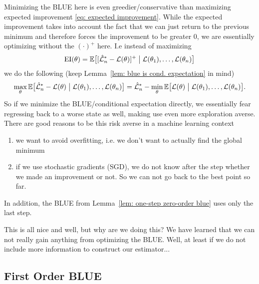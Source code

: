 Minimizing the BLUE here is even greedier/conservative than maximizing
expected improvement \eqref{eq: expected improvement}. While the expected
improvement takes into account the fact that we can just return to the previous
minimum and therefore forces the improvement to be greater \(0\), we are
essentially optimizing without the \((\cdot)^+\) here. I.e instead of
maximizing
\begin{equation*}
	\operatorname{EI}(\theta) = \mathbb{E}\big[
			[\hat{\mathcal{L}}_n^*- \mathcal{L}(\theta)]^+
			\bigm|
			\mathcal{L}(\theta_1),\dots, \mathcal{L}(\theta_n)
		\big]
\end{equation*}
we do the following (keep Lemma~\ref{lem: blue is cond. expectation} in mind)
\begin{equation*}
	\max_{\theta} \mathbb{E}\big[
		\hat{\mathcal{L}}_n^*- \mathcal{L}(\theta)
		\bigm|
		\mathcal{L}(\theta_1),\dots, \mathcal{L}(\theta_n)
	\big]
	= \hat{\mathcal{L}}_n^* - \min_{\theta} \mathbb{E}\big[
		\mathcal{L}(\theta)
		\bigm|
		\mathcal{L}(\theta_1),\dots, \mathcal{L}(\theta_n)
	\big].
\end{equation*}
So if we minimize the BLUE/conditional expectation directly, we essentially fear
regressing back to a worse state as well, making use even more exploration
averse. There are good reasons to be this risk averse in a machine learning
context
\begin{enumerate}
	\item we want to avoid overfitting, i.e. we don't want to actually find the
	global minimum
	\item if we use stochastic gradients (SGD), we do not know after the step
	whether we made an improvement or not. So we can not go back to the best
	point so far.
\end{enumerate}
In addition, the BLUE from Lemma~\ref{lem: one-step zero-order blue}
uses only the last step.

This is all nice and well, but why are we doing this? We have learned that we
can not really gain anything from optimizing the BLUE. Well, at least if we do
not include more information to construct our estimator...

\subsection{First Order BLUE}

